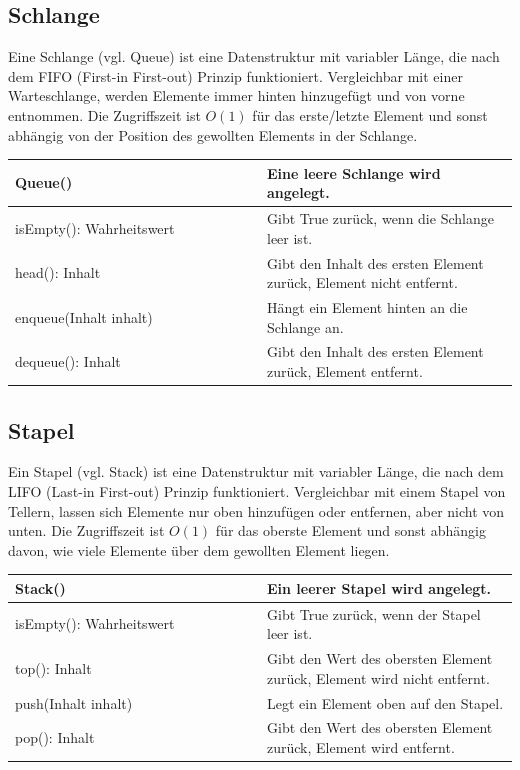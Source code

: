 \clearpage

\subsection{Schlange}

Eine Schlange (vgl. Queue) ist eine Datenstruktur mit variabler Länge, die nach dem
FIFO (First-in First-out) Prinzip funktioniert. Vergleichbar mit einer Warteschlange,
werden Elemente immer hinten hinzugefügt und von vorne entnommen. Die Zugriffszeit ist
$O(1)$ für das erste/letzte Element und sonst abhängig von der Position des gewollten
Elements in der Schlange.

\begin{table}[H]
    \begin{tabular}{|p{0.5\linewidth}|p{0.5\linewidth}|}
    \hline
    Queue() & Eine leere Schlange wird angelegt. \\ \hline
    isEmpty(): Wahrheitswert & Gibt True zurück, wenn die Schlange leer ist. \\ \hline
    head(): Inhalt & Gibt den Inhalt des ersten Element zurück, Element nicht entfernt. \\ \hline
    enqueue(Inhalt inhalt) & Hängt ein Element hinten an die Schlange an. \\ \hline
    dequeue(): Inhalt & Gibt den Inhalt des ersten Element zurück, Element entfernt. \\ \hline
    \end{tabular}
\end{table}

\subsection{Stapel}

Ein Stapel (vgl. Stack) ist eine Datenstruktur mit variabler Länge, die nach dem
LIFO (Last-in First-out) Prinzip funktioniert. Vergleichbar mit einem Stapel von Tellern,
lassen sich Elemente nur oben hinzufügen oder entfernen, aber nicht von unten.
Die Zugriffszeit ist $O(1)$ für das oberste Element und sonst abhängig davon, wie viele
Elemente über dem gewollten Element liegen.

\begin{table}[H]
    \begin{tabular}{|p{0.5\linewidth}|p{0.5\linewidth}|}
    \hline
    Stack() & Ein leerer Stapel wird angelegt. \\ \hline
    isEmpty(): Wahrheitswert & Gibt True zurück, wenn der Stapel leer ist. \\ \hline
    top(): Inhalt & Gibt den Wert des obersten Element zurück, Element wird nicht entfernt. \\ \hline
    push(Inhalt inhalt) & Legt ein Element oben auf den Stapel. \\ \hline
    pop(): Inhalt & Gibt den Wert des obersten Element zurück, Element wird entfernt.  \\ \hline
    \end{tabular}
\end{table}

